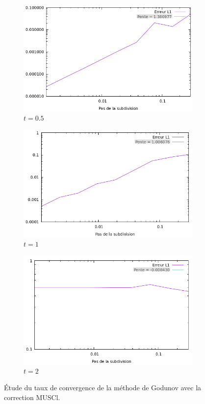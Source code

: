\documentclass[
	french,
	11pt, %
]{fphw}
\begin{document}
\begin{figure}[H]
	\centering
	\begin{subfigure}{0.32\textwidth}
		\centering
		\includegraphics[width=\textwidth]{MusclConv1.png}
		\caption{$t=0.5$}
	\end{subfigure}
	\begin{subfigure}{0.32\textwidth}
		\centering
		\includegraphics[width=\textwidth]{MusclConv2.png}
		\caption{$t=1$}
	\end{subfigure}
	\begin{subfigure}{0.32\textwidth}
		\centering
		\includegraphics[width=\textwidth]{MusclConv3.png}
		\caption{$t=2$}
		\label{fig:MusclFaux4}
\end{subfigure}
	\caption{Étude du taux de convergence de la méthode de Godunov avec la correction MUSCl.}
	\label{fig:MusclConv}
\end{figure}
\end{document}
